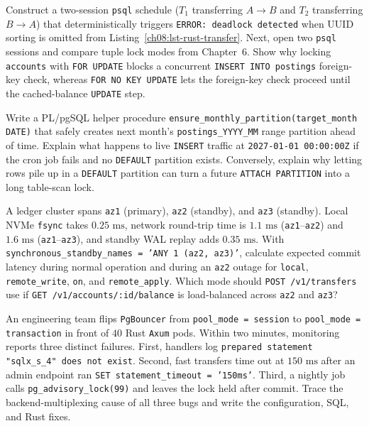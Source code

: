 \begin{exercise}
Construct a two-session \texttt{psql} schedule ($T_1$ transferring $A \to B$ and
$T_2$ transferring $B \to A$) that deterministically triggers
\texttt{ERROR: deadlock detected} when UUID sorting is omitted from
Listing~\ref{ch08:lst-rust-transfer}. Next, open two \texttt{psql} sessions and
compare tuple lock modes from Chapter~6. Show why locking \texttt{accounts} with
\texttt{FOR UPDATE} blocks a concurrent \texttt{INSERT INTO postings} foreign-key
check, whereas \texttt{FOR NO KEY UPDATE} lets the foreign-key check proceed until
the cached-balance \texttt{UPDATE} step.
\end{exercise}

\begin{exercise}
Write a PL/pgSQL helper procedure \texttt{ensure\_monthly\_partition(target\_month
DATE)} that safely creates next month's \texttt{postings\_YYYY\_MM} range partition
ahead of time. Explain what happens to live \texttt{INSERT} traffic at
\texttt{2027-01-01 00:00:00Z} if the cron job fails and no \texttt{DEFAULT}
partition exists. Conversely, explain why letting rows pile up in a
\texttt{DEFAULT} partition can turn a future \texttt{ATTACH PARTITION} into a long
table-scan lock.
\end{exercise}

\begin{exercise}
A ledger cluster spans \texttt{az1} (primary), \texttt{az2} (standby), and
\texttt{az3} (standby). Local NVMe \texttt{fsync} takes $0.25\text{ ms}$, network
round-trip time is $1.1\text{ ms}$ (\texttt{az1}--\texttt{az2}) and $1.6\text{ ms}$
(\texttt{az1}--\texttt{az3}), and standby WAL replay adds $0.35\text{ ms}$. With
\texttt{synchronous\_standby\_names = 'ANY 1 (az2, az3)'}, calculate expected
commit latency during normal operation and during an \texttt{az2} outage for
\texttt{local}, \texttt{remote\_write}, \texttt{on}, and \texttt{remote\_apply}.
Which mode should \texttt{POST /v1/transfers} use if \texttt{GET
/v1/accounts/:id/balance} is load-balanced across \texttt{az2} and \texttt{az3}?
\end{exercise}

\begin{exercise}
An engineering team flips \texttt{PgBouncer} from \texttt{pool\_mode = session} to
\texttt{pool\_mode = transaction} in front of $40$ Rust \texttt{Axum} pods. Within
two minutes, monitoring reports three distinct failures. First, handlers log
\texttt{prepared statement "sqlx\_s\_4" does not exist}. Second, fast transfers
time out at $150\text{ ms}$ after an admin endpoint ran \texttt{SET
statement\_timeout = '150ms'}. Third, a nightly job calls
\texttt{pg\_advisory\_lock(99)} and leaves the lock held after commit. Trace the
backend-multiplexing cause of all three bugs and write the configuration, SQL,
and Rust fixes.
\end{exercise}
